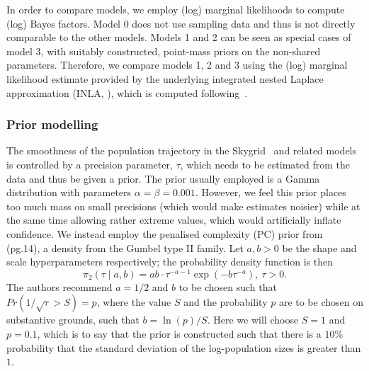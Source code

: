 \documentclass[a4paper,10pt]{article}
\begin{document}
In order to compare models, we employ (log) marginal likelihoods to compute (log) Bayes factors.
Model 0 does not use sampling data and thus is not directly comparable to the other models.
Models 1 and 2 can be seen as special cases of model 3, with suitably constructed, point-mass priors on the non-shared parameters.
Therefore, we compare models 1, 2 and 3 using the (log) marginal likelihood estimate provided by the underlying integrated nested Laplace approximation (INLA, \cite{Martins2013}), which is computed following~\citet{Hubin2016}.

\subsubsection*{Prior modelling}

The smoothness of the population trajectory in the Skygrid~\citep{M-Gill2013} %
and related models is controlled by a precision parameter, $\tau$, which needs to be estimated from the data and thus be given a prior.
The prior usually employed is a Gamma distribution with parameters $\alpha = \beta = 0.001$. 
However, we feel this prior places too much mass on small precisions (which would make estimates noisier) while at the same time allowing rather extreme values, which would artificially inflate confidence.
We instead employ the penalised complexity (PC) prior from~\citet{M-Simpson2017} (pg.14), a density from the Gumbel type II family.
Let $a, b > 0$ be the shape and scale hyperparameters respectively; the probability density function is then
\begin{equation}
 \pi_2(\tau \mid a, b) = ab \cdot \tau^{-a-1}\exp\left(-b\tau^{-a}\right),\: \tau > 0.
\end{equation}
The authors recommend $a = 1/2$ and $b$ to be chosen such that $Pr(1/\sqrt{\tau} > S) = p$, where the value $S$ and the probability $p$ are to be chosen on substantive grounds, such that $b = \ln(p)/S$.
Here we will choose $S = 1$ and $p = 0.1$, which is to say that the prior is constructed such that there is a $10\%$ probability that the standard deviation of the log-population sizes is greater than $1$.
\end{document}
